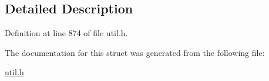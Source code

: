 \subsection{Detailed Description}


Definition at line 874 of file util.\+h.



The documentation for this struct was generated from the following file\+:\begin{DoxyCompactItemize}
\item 
\hyperlink{util_8h}{util.\+h}\end{DoxyCompactItemize}
